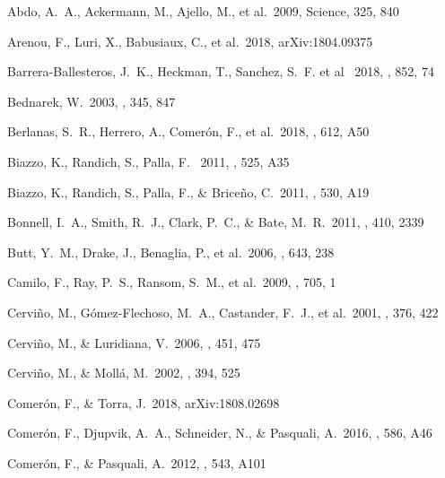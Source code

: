 \documentclass{aa} %
\begin{document}
\begin{thebibliography}{}

	 Abdo, A.~A., Ackermann, M., Ajello, M., et al.\ 2009, Science, 325, 840
	
	 Arenou, F., Luri, X., Babusiaux, C., et al.\ 2018, arXiv:1804.09375
	

	 Barrera-Ballesteros, J.~K., Heckman, T., Sanchez, S.~F. et al \ 2018, \apj, 852, 74
    
	 Bednarek, W.\ 2003, \mnras, 345, 847
	
	 Berlanas, S.~R., Herrero, A., Comer{\'o}n, F., et al.\ 2018,  \aap, 612, A50 
    
     Biazzo, K., Randich, S., Palla, F. \ 2011, \aap, 525, A35  
    
	 Biazzo, K., Randich, S., Palla, F., \& Brice{\~n}o, C.\ 2011, \aap, 530, A19  
  
	
	 Bonnell, I.~A., Smith, R.~J., Clark, P.~C., \& Bate, M.~R.\ 2011, \mnras, 410, 2339 
	
	
	 Butt, Y.~M., Drake, J., Benaglia, P., et al.\ 2006, \apj, 643, 238
	
	 Camilo, F., Ray, P.~S., Ransom, S.~M., et al.\ 2009, \apj, 705, 1 
	

   Cervi{\~n}o, M., G{\'o}mez-Flechoso, M.~A., Castander, F.~J., et al.\ 2001, \aap, 376, 422 

    Cervi{\~n}o, M., \& Luridiana, V.\ 2006, \aap, 451, 475 

    Cervi{\~n}o, M., \& Moll{\'a}, M.\ 2002, \aap, 394, 525 


	 Comer{\'o}n, F., \& Torra, J.\ 2018, arXiv:1808.02698 


	 Comer{\'o}n, F., Djupvik, A.~A., Schneider, N., \& Pasquali, A.\ 2016, \aap, 586, A46 

	 Comer{\'o}n, F., \& Pasquali, A.\ 2012, \aap, 543, A101 
	

\end{thebibliography}
\end{document}
